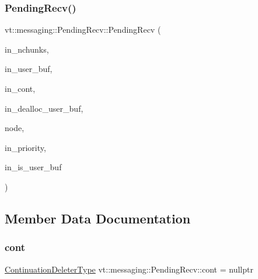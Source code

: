 \subsubsection{\texorpdfstring{Pending\+Recv()}{PendingRecv()}}
{\footnotesize\ttfamily vt\+::messaging\+::\+Pending\+Recv\+::\+Pending\+Recv (\begin{DoxyParamCaption}\item[{int}]{in\+\_\+nchunks,  }\item[{void $\ast$}]{in\+\_\+user\+\_\+buf,  }\item[{\hyperlink{namespacevt_a6de3bd201e2a040be9362d9d24d1e446}{Continuation\+Deleter\+Type}}]{in\+\_\+cont,  }\item[{\hyperlink{namespacevt_ae0a5a7b18cc99d7b732cb4d44f46b0f3}{Action\+Type}}]{in\+\_\+dealloc\+\_\+user\+\_\+buf,  }\item[{\hyperlink{namespacevt_a866da9d0efc19c0a1ce79e9e492f47e2}{Node\+Type}}]{node,  }\item[{\hyperlink{namespacevt_a86bff9f556eb761b27fc8600d006ac04}{Priority\+Type}}]{in\+\_\+priority,  }\item[{bool}]{in\+\_\+is\+\_\+user\+\_\+buf }\end{DoxyParamCaption})\hspace{0.3cm}{\ttfamily [inline]}}



\subsection{Member Data Documentation}
\mbox{\label{structvt_1_1messaging_1_1_pending_recv_a38dbaba9db9f4fd8d3e72553f030a21d}} 
\subsubsection{\texorpdfstring{cont}{cont}}
{\footnotesize\ttfamily \hyperlink{namespacevt_a6de3bd201e2a040be9362d9d24d1e446}{Continuation\+Deleter\+Type} vt\+::messaging\+::\+Pending\+Recv\+::cont = nullptr}

\mbox{\label{structvt_1_1messaging_1_1_pending_recv_a1d0de0586d485b2b6af7daacafa7ea0d}} 
